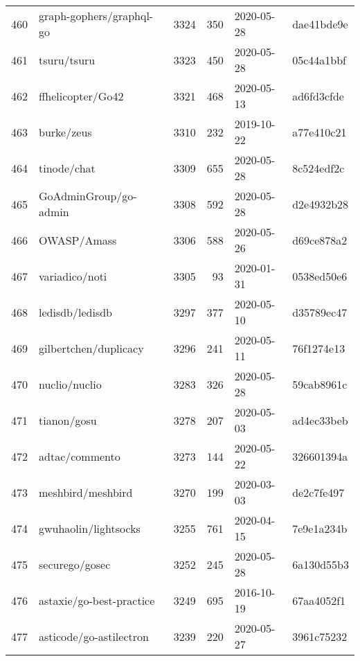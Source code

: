 \begin{longtable}{llrrll}
    460 &                           graph-gophers/graphql-go &   3324 &    350 & 2020-05-28 &  dae41bde9e \\
    461 &                                        tsuru/tsuru &   3323 &    450 & 2020-05-28 &  05c44a1bbf \\
    462 &                                  ffhelicopter/Go42 &   3321 &    468 & 2020-05-13 &  ad6fd3cfde \\
    463 &                                         burke/zeus &   3310 &    232 & 2019-10-22 &  a77e410c21 \\
    464 &                                        tinode/chat &   3309 &    655 & 2020-05-28 &  8c524edf2c \\
    465 &                              GoAdminGroup/go-admin &   3308 &    592 & 2020-05-28 &  d2e4932b28 \\
    466 &                                        OWASP/Amass &   3306 &    588 & 2020-05-26 &  d69ce878a2 \\
    467 &                                     variadico/noti &   3305 &     93 & 2020-01-31 &  0538ed50e6 \\
    468 &                                    ledisdb/ledisdb &   3297 &    377 & 2020-05-10 &  d35789ec47 \\
    469 &                              gilbertchen/duplicacy &   3296 &    241 & 2020-05-11 &  76f1274e13 \\
    470 &                                      nuclio/nuclio &   3283 &    326 & 2020-05-28 &  59cab8961c \\
    471 &                                        tianon/gosu &   3278 &    207 & 2020-05-03 &  ad4ec33beb \\
    472 &                                     adtac/commento &   3273 &    144 & 2020-05-22 &  326601394a \\
    473 &                                  meshbird/meshbird &   3270 &    199 & 2020-03-03 &  de2c7fe497 \\
    474 &                               gwuhaolin/lightsocks &   3255 &    761 & 2020-04-15 &  7e9e1a234b \\
    475 &                                     securego/gosec &   3252 &    245 & 2020-05-28 &  6a130d55b3 \\
    476 &                           astaxie/go-best-practice &   3249 &    695 & 2016-10-19 &  67aa4052f1 \\
    477 &                            asticode/go-astilectron &   3239 &    220 & 2020-05-27 &  3961c75232 \\

\end{longtable}
